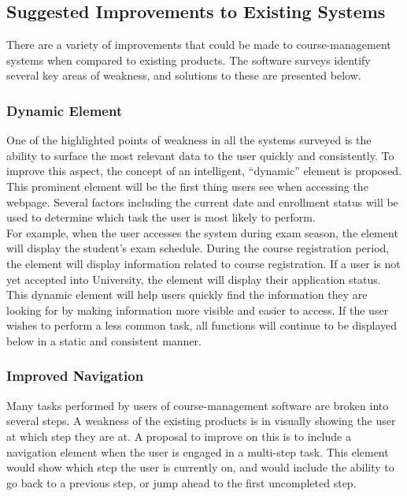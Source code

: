\documentclass[10pt]{article}
\begin{document}
\begin{multicols}{2}
\subsection*{Suggested Improvements to Existing Systems}
There are a variety of improvements that could be made to course-management 
systems when compared to existing products. The software surveys identify 
several key areas of weakness, and solutions to these are presented below.\\

\subsubsection*{Dynamic Element}
One of the highlighted points of weakness in all the systems surveyed is the 
ability to surface the most relevant data to the user quickly and consistently. 
To improve this aspect, the concept of an intelligent, ``dynamic'' element is 
proposed. This prominent element will be the first thing users see when 
accessing the webpage. Several factors including the current date and enrollment 
status will be used to determine which task the user is most likely to perform.
\\

For example, when the user accesses the system during exam season, the element 
will display the student's exam schedule. During the course registration period, 
the element will display information related to course registration. If a user 
is not yet accepted into University, the element will display their application 
status.\\

This dynamic element will help users quickly find the information they are 
looking for by making information more visible and easier to access. If the user 
wishes to perform a less common task, all functions will continue to be 
displayed below in a static and consistent manner.\\

\subsubsection*{Improved Navigation}
Many tasks performed by users of course-management software are broken into 
several steps. A weakness of the existing products is in visually showing the 
user at which step they are at. A proposal to improve on this is to include a 
navigation element when the user is engaged in a multi-step task. This element 
would show which step the user is currently on, and would include the ability to 
go back to a previous step, or jump ahead to the first uncompleted step.\\


\end{multicols}
\end{document}
